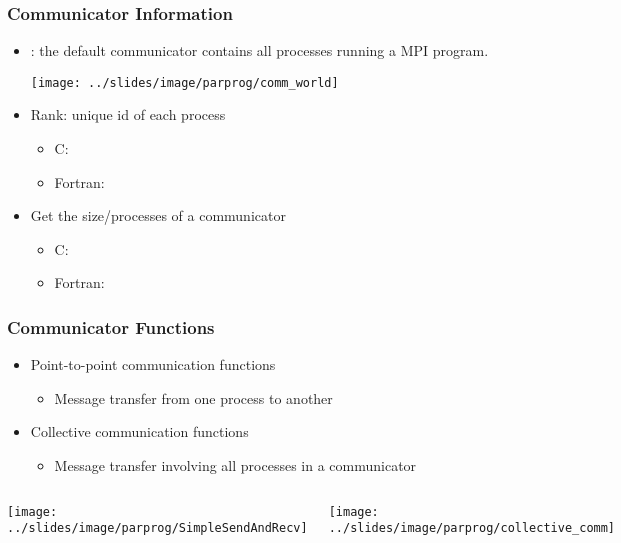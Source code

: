 \documentclass[9pt,c]{beamer}
\begin{document}
\begin{frame}[fragile]
  \frametitle{Communicator Information}
  \begin{itemize}
  \item {}: the default communicator contains all processes running a MPI program.
    \begin{center}
      \texttt{[image: ../slides/image/parprog/comm\_world]}      
    \end{center}
  \item Rank: unique id of each process
    \begin{itemize}
    \item \textcolor{lubrown}{C:} 
    \item \textcolor{lubrown}{Fortran:} 
    \end{itemize}
  \item Get the size/processes of a communicator
    \begin{itemize}
    \item \textcolor{lubrown}{C:} 
    \item \textcolor{lubrown}{Fortran:} 
    \end{itemize}
  \end{itemize}
\end{frame}

\begin{frame}
  \frametitle{Communicator Functions}
  \begin{itemize}
  \item Point-to-point communication functions
    \begin{itemize}
    \item Message transfer from one process to another
    \end{itemize}
  \item Collective communication functions 
    \begin{itemize}
    \item Message transfer involving all processes in a communicator
    \end{itemize}
  \end{itemize}
  \begin{columns}
    \begin{center}
      \texttt{[image: ../slides/image/parprog/SimpleSendAndRecv]}
    \end{center}
    \begin{center}
      \texttt{[image: ../slides/image/parprog/collective\_comm]}
    \end{center}
  \end{columns}
\end{frame}
\end{document}
